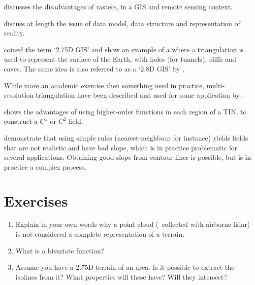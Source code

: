 \citet{Fisher97} discusses the disadvantages of rasters, in a GIS and remote sensing context.

\citet{Frank92,Goodchild92a} discuss at length the issue of data model, data structure and representation of reality. 

\citet{Tse04} coined the term `2.75D GIS' and show an example of a where a triangulation is used to represent the surface of the Earth, with holes (for tunnels), cliffs and caves. 
The same idea is also referred to as a `2.8D GIS' by \citet{Groger05}.

While more an academic exercise then something used in practice, multi-resolution triangulation have been described and used for some application by \citet{DeFloriani02}.

\citet{Akima78} shows the advantages of using higher-order functions in each region of a TIN, to construct a $C^1$ or $C^2$ field. 

\citet{Dakowicz03} demonstrate that using simple rules (nearest-neighbour for instance) yields fields that are not realistic and have bad slope, which is in practice problematic for several applications.
Obtaining good slope from contour lines is possible, but is in practice a complex process.


%
\section{Exercises}

\begin{enumerate}
  \item Explain in your own words why a point cloud (\eg\ collected with airborne lidar) is not considered a complete representation of a terrain.
  \item What is a bivariate function? 
  \item Assume you have a 2.75D terrain of an area. Is it possible to extract the isolines from it? What properties will these have? Will they intersect?
\end{enumerate}
